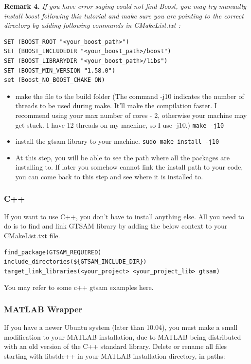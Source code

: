 \documentclass[tp]{lcc}
\begin{document}
\textbf{Remark 4.} \textit{If you have error saying could not find Boost, you may try manually install boost following this tutorial and make sure you are pointing to the correct directory by adding following commands in CMakeList.txt :}

\begin{lstlisting}[style=bash]
SET (BOOST_ROOT "<your_boost_path>")
SET (BOOST_INCLUDEDIR "<your_boost_path>/boost")
SET (BOOST_LIBRARYDIR "<your_boost_path>/libs")
SET (BOOST_MIN_VERSION "1.58.0")
set (Boost_NO_BOOST_CHAKE ON)
\end{lstlisting}

\begin{itemize}
    \item make the file to the build folder (The command -j10 indicates the number of threads to be used during make. It'll make the compilation faster. I recommend using your max number of cores - 2, otherwise your machine may get stuck. I have 12 threads on my machine, so I use -j10.) \lstinline[style=bash]{make -j10}
    \item install the gtsam library to your machine. \lstinline[style=bash]{sudo make install -j10}
    \item At this step, you will be able to see the path where all the packages are installing to. If later you somehow cannot link the install path to your code, you can come back to this step and see where it is installed to.
\end{itemize}

\subsubsection{C++}
If you want to use C++, you don't have to install anything else. All you need to do is to find and link GTSAM library by adding the below context to your CMakeList.txt file.

\begin{lstlisting}[style=cmake]
find_package(GTSAM_REQUIRED)
include_directories(${GTSAM_INCLUDE_DIR})
target_link_libraries(<your_project> <your_project_lib> gtsam)
\end{lstlisting}
You may refer to some c++ gtsam examples here.

\subsubsection{MATLAB Wrapper}
If you have a newer Ubuntu system (later than 10.04), you must make a small modification to your MATLAB installation, due to MATLAB being distributed with an old version of the C++ standard library. Delete or rename all files starting with libstdc++ in your MATLAB installation directory, in paths:
\end{document}
